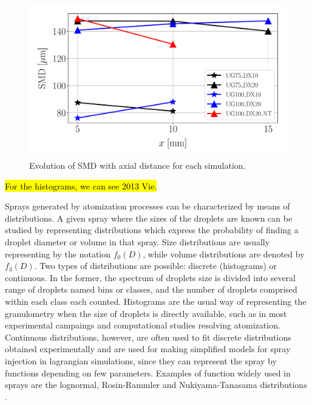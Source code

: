 \begin{figure}[ht]
\centering
   \includegraphics[scale=0.30]{./part2_developments/figures_ch5_resolved_JICF/SPRAY_characterization/SMD_values}
   \vspace*{-0.2in}
   \caption{Evolution of SMD with axial distance for each simulation.}
   \label{fig:ch5_spray_char_SMD_final}
\end{figure}


\hl{For the histograms, we can see 2013 Vie.}

Sprays generated by atomization processes can be characterized by means of distributions. A given spray where the sizes of the droplets are known can be studied by representing distributions which express the probability of finding a droplet diameter or volume in that spray. Size distributions are usually representing by the notation $f_0 \left( D \right)$, while volume distributions are denoted by $f_3 \left( D \right)$. Two types of distributions are possible: discrete (histograms) or continuous. In the former, the spectrum of droplets size is divided into several range of droplets named bins or classes, and the number of droplets comprised within each class each counted. Histograms are the usual way of representing the granulometry when the size of droplets is directly available, such as in most experimental campaings and computational studies resolving atomization. Continuous distributions, however, are often used to fit discrete distributions obtained experimentally and are used for making simplified models for spray injection in lagrangian simulations, since they can represent the spray by functions depending on few parameters. Examples of function widely used in sprays are the lognormal, Rosin-Rammler and Nukiyama-Tanasama distributions . 

